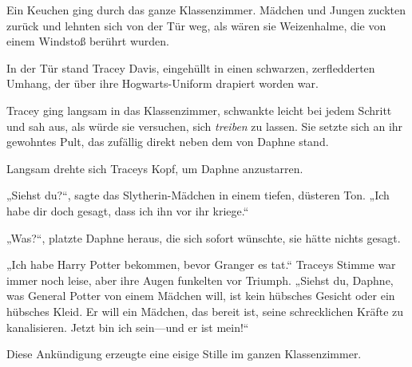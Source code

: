 Ein Keuchen ging durch das ganze Klassenzimmer. Mädchen und Jungen zuckten zurück und lehnten sich von der Tür weg, als wären sie Weizenhalme, die von einem Windstoß berührt wurden.

In der Tür stand Tracey Davis, eingehüllt in einen schwarzen, zerfledderten Umhang, der über ihre Hogwarts-Uniform drapiert worden war.

Tracey ging langsam in das Klassenzimmer, schwankte leicht bei jedem Schritt und sah aus, als würde sie versuchen, sich \emph{treiben} zu lassen. Sie setzte sich an ihr gewohntes Pult, das zufällig direkt neben dem von Daphne stand.

Langsam drehte sich Traceys Kopf, um Daphne anzustarren.

„Siehst du?“, sagte das Slytherin-Mädchen in einem tiefen, düsteren Ton. „Ich habe dir doch gesagt, dass ich ihn vor ihr kriege.“

„Was?“, platzte Daphne heraus, die sich sofort wünschte, sie hätte nichts gesagt.

„Ich habe Harry Potter bekommen, bevor Granger es tat.“ Traceys Stimme war immer noch leise, aber ihre Augen funkelten vor Triumph. „Siehst du, Daphne, was General Potter von einem Mädchen will, ist kein hübsches Gesicht oder ein hübsches Kleid. Er will ein Mädchen, das bereit ist, seine schrecklichen Kräfte zu kanalisieren. Jetzt bin ich sein—und er ist mein!“

Diese Ankündigung erzeugte eine eisige Stille im ganzen Klassenzimmer.

